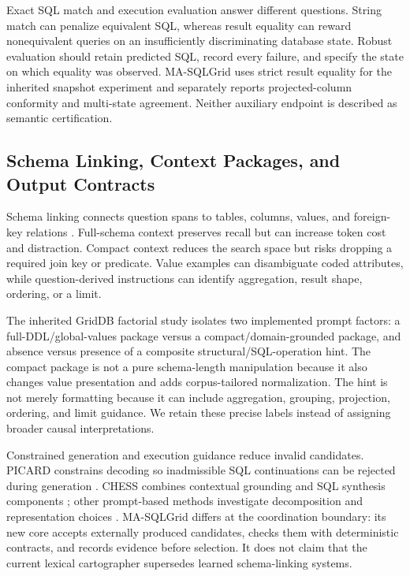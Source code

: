 \documentclass[applsci,article,submit,moreauthors]{Definitions/mdpi}
\newcommand{\masql}{MA-SQLGrid}
\begin{document}
Exact SQL match and execution evaluation answer different questions. String match can penalize equivalent SQL, whereas result equality can reward nonequivalent queries on an insufficiently discriminating database state. Robust evaluation should retain predicted SQL, record every failure, and specify the state on which equality was observed. \masql{} uses strict result equality for the inherited snapshot experiment and separately reports projected-column conformity and multi-state agreement. Neither auxiliary endpoint is described as semantic certification.

\subsection{Schema Linking, Context Packages, and Output Contracts}

Schema linking connects question spans to tables, columns, values, and foreign-key relations \cite{wang2020ratsql,lei2020reexamining,liu2022semantic}. Full-schema context preserves recall but can increase token cost and distraction. Compact context reduces the search space but risks dropping a required join key or predicate. Value examples can disambiguate coded attributes, while question-derived instructions can identify aggregation, result shape, ordering, or a limit.

The inherited GridDB factorial study isolates two implemented prompt factors: a full-DDL/global-values package versus a compact/domain-grounded package, and absence versus presence of a composite structural/SQL-operation hint. The compact package is not a pure schema-length manipulation because it also changes value presentation and adds corpus-tailored normalization. The hint is not merely formatting because it can include aggregation, grouping, projection, ordering, and limit guidance. We retain these precise labels instead of assigning broader causal interpretations.

Constrained generation and execution guidance reduce invalid candidates. PICARD constrains decoding so inadmissible SQL continuations can be rejected during generation \cite{scholak2021picard}. CHESS combines contextual grounding and SQL synthesis components \cite{talaei2024chess}; other prompt-based methods investigate decomposition and representation choices \cite{nan2023enhancing,sun2023sqlprompt,pourreza2023dinsql}. \masql{} differs at the coordination boundary: its new core accepts externally produced candidates, checks them with deterministic contracts, and records evidence before selection. It does not claim that the current lexical cartographer supersedes learned schema-linking systems.
\end{document}
